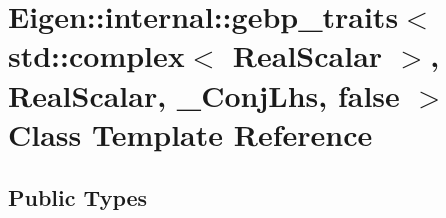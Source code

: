 \hypertarget{class_eigen_1_1internal_1_1gebp__traits_3_01std_1_1complex_3_01_real_scalar_01_4_00_01_real_scald728c008ac4da8a5a1327d1e06be8c1f}{}\section{Eigen\+:\+:internal\+:\+:gebp\+\_\+traits$<$ std\+:\+:complex$<$ Real\+Scalar $>$, Real\+Scalar, \+\_\+\+Conj\+Lhs, false $>$ Class Template Reference}
\label{class_eigen_1_1internal_1_1gebp__traits_3_01std_1_1complex_3_01_real_scalar_01_4_00_01_real_scald728c008ac4da8a5a1327d1e06be8c1f}
\subsection*{Public Types}
